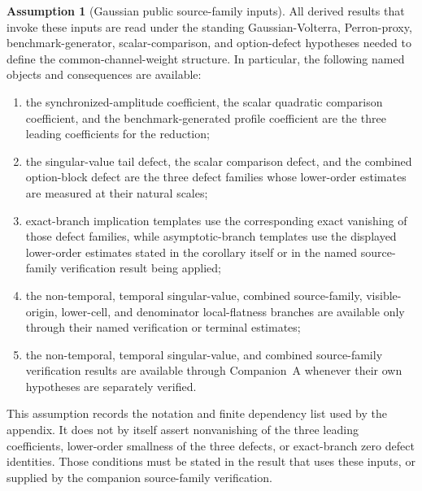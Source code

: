 \documentclass[11pt,a4paper]{amsart}
\theoremstyle{plain}
\theoremstyle{definition}
\newtheorem{assumption}[theorem]{Assumption}
\theoremstyle{remark}
\begin{document}
\begin{assumption}[Gaussian public source-family inputs]\label{ass:gaussian-lambda-public-frontier}
All derived results that invoke these inputs are read under the standing Gaussian-Volterra,
Perron-proxy, benchmark-generator, scalar-comparison, and option-defect hypotheses needed to
define the common-channel-weight structure.  In particular, the following named objects and
consequences are available:
\begin{enumerate}[label=(\roman*)]
\item the synchronized-amplitude coefficient, the scalar quadratic comparison coefficient, and
the benchmark-generated profile coefficient are the three leading coefficients for the
reduction;
\item the singular-value tail defect, the scalar comparison defect, and the combined option-block
defect are the three defect families whose lower-order estimates are measured at their natural
scales;
\item exact-branch implication templates use the corresponding exact vanishing of those defect
families, while asymptotic-branch templates use the displayed lower-order estimates stated in the
corollary itself or in the named source-family verification result being applied;
\item the non-temporal, temporal singular-value, combined source-family, visible-origin, lower-cell,
and denominator local-flatness branches are available only through their named verification or
terminal estimates;
\item the non-temporal, temporal singular-value, and combined source-family verification results are
available through Companion~A whenever their own hypotheses are separately
verified.
\end{enumerate}
This assumption records the notation and finite dependency list used by the appendix.
It does not by itself assert nonvanishing of
the three leading coefficients, lower-order smallness of the three defects, or exact-branch zero
defect identities.  Those conditions must be stated in the result that uses these inputs, or supplied by the companion
source-family verification.
\end{assumption}
\end{document}
